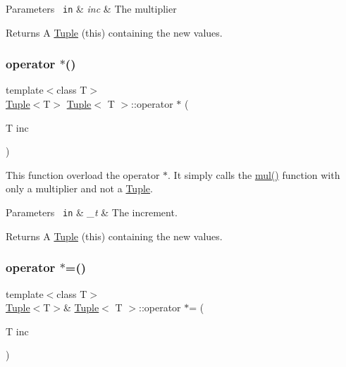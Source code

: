 \begin{DoxyParams}[1]{Parameters}
\mbox{\texttt{ in}}  & {\em inc} & The multiplier\\
\hline
\end{DoxyParams}
\begin{DoxyReturn}{Returns}
A {\ttfamily \mbox{\hyperlink{class_tuple}{Tuple}}} (this) containing the new values. 
\end{DoxyReturn}
\mbox{\label{class_tuple_ab5bd095731feb7aa39bcf41778eb144f}} 
\subsubsection{\texorpdfstring{operator $\ast$()}{operator *()}}
{\footnotesize\ttfamily template$<$class T$>$ \\
\mbox{\hyperlink{class_tuple}{Tuple}}$<$T$>$ \mbox{\hyperlink{class_tuple}{Tuple}}$<$ T $>$\+::operator $\ast$ (\begin{DoxyParamCaption}\item[{T}]{inc }\end{DoxyParamCaption})\hspace{0.3cm}{\ttfamily [inline]}}

This function overload the operator $\ast$. It simply calls the {\ttfamily \mbox{\hyperlink{class_tuple_aa04cadf68dd3658943db047b6fd500fa}{mul()}}} function with only a multiplier and not a {\ttfamily \mbox{\hyperlink{class_tuple}{Tuple}}}. 
\begin{DoxyParams}[1]{Parameters}
\mbox{\texttt{ in}}  & {\em \+\_\+t} & The increment. \\
\hline
\end{DoxyParams}
\begin{DoxyReturn}{Returns}
A {\ttfamily \mbox{\hyperlink{class_tuple}{Tuple}}} (this) containing the new values. 
\end{DoxyReturn}
\mbox{\label{class_tuple_a5dfd14ef6f956b608d6a99bdf0cf9c75}} 
\subsubsection{\texorpdfstring{operator $\ast$=()}{operator *=()}}
{\footnotesize\ttfamily template$<$class T$>$ \\
\mbox{\hyperlink{class_tuple}{Tuple}}$<$T$>$\& \mbox{\hyperlink{class_tuple}{Tuple}}$<$ T $>$\+::operator $\ast$= (\begin{DoxyParamCaption}\item[{T}]{inc }\end{DoxyParamCaption})\hspace{0.3cm}{\ttfamily [inline]}}

